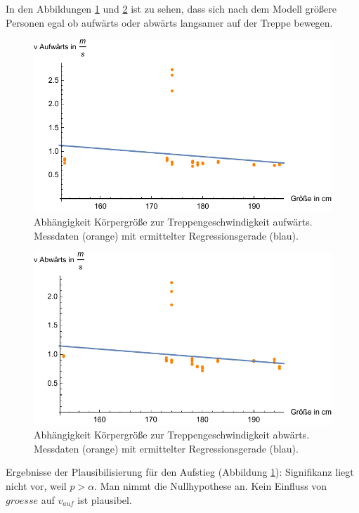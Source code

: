 In den Abbildungen \ref{fig:auf2012-groesse} und \ref{fig:ab2012-groesse} ist 
zu sehen, dass sich nach dem Modell größere Personen egal ob aufwärts oder abwärts langsamer auf der Treppe bewegen.

\begin{figure} \centering 
	\includegraphics[]{abbildungen/regression/2012/auf-groesse.pdf}
	
	\caption{Abhängigkeit Körpergröße zur Treppengeschwindigkeit aufwärts. Messdaten (orange) mit ermittelter Regressionsgerade (blau). \label{fig:auf2012-groesse}}
\end{figure}

\begin{figure} \centering 
	\includegraphics[]{abbildungen/regression/2012/ab-groesse.pdf}
	
	\caption{Abhängigkeit Körpergröße zur Treppengeschwindigkeit abwärts. Messdaten (orange) mit ermittelter Regressionsgerade (blau). \label{fig:ab2012-groesse}}
\end{figure}

Ergebnisse der Plausibilisierung für den Aufstieg 
(Abbildung \ref{fig:auf2012-groesse}):
Signifikanz liegt nicht vor, weil $p > \alpha$. Man nimmt die
Nullhypothese an. Kein Einfluss von $groesse$ auf $v_{auf}$ ist plausibel.

